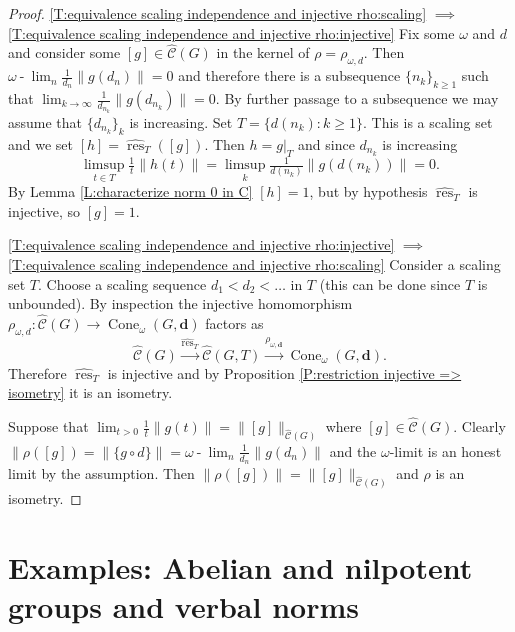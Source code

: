 \documentclass[12pt]{amsart}
\theoremstyle{definition}
\def\res{\operatorname{res}}
\newcommand{\B}[1]{\mathbf{#1}}
\newcommand{\xto}[1]{\xrightarrow{#1}}
\newcommand{\OP}[1]{\operatorname{#1}}
\def\omegalim{\omega\operatorname{-}\lim}
\def\Cone{\OP{Cone}}
\def\tC{\hat{\mathcal{C}}}
\begin{document}
\begin{proof}
\ref{T:equivalence scaling independence and injective rho:scaling} $\implies$ \ref{T:equivalence scaling independence and injective rho:injective}
Fix some $\omega$ and $d$ and consider some $[g] \in \tC(G)$ in the kernel of $\rho=\rho_{\omega,d}$.
Then $\omegalim_n \tfrac{1}{d_n}\|g(d_n)\|=0$ and therefore there is a subsequence $\{ n_k\}_{k \geq 1}$ such that $\lim_{k \to \infty} \tfrac{1}{d_{n_k}} \| g(d_{n_k})\|=0$.
By further passage to a subsequence we may assume that $\{d_{n_k}\}_k$ is increasing.
Set $T=\{ d(n_k) : k \geq 1\}$.
This is a scaling set and we set $[h]=\widehat{\res}_T([g])$.
Then  $h=g|_T$ and since $d_{n_k}$ is increasing
\[
\limsup_{t \in T} \tfrac{1}{t}\|h(t)\| = \limsup_k \tfrac{1}{d(n_k)}\|g(d(n_k))\|=0.
\]
By Lemma \ref{L:characterize norm 0 in C} $[h]=1$, but by hypothesis $\widehat{\res}_T$ is injective, so $[g]=1$.


\ref{T:equivalence scaling independence and injective rho:injective} $\implies$ \ref{T:equivalence scaling independence and injective rho:scaling}
Consider a scaling set $T$.
Choose a scaling sequence $d_1<d_2<\dots$ in $T$ (this can be done since $T$ is unbounded).
By inspection the injective homomorphism $\rho_{\omega,d} \colon \tC(G) \to \Cone_\omega(G,\B d)$ factors as
\[
\tC(G) \xto{\widehat{\res}_T} \tC(G,T) \xto{\rho_{\omega,\B d}} \Cone_\omega(G,\B d).
\]
Therefore $\widehat{\res}_T$ is injective and by Proposition \ref{P:restriction injective => isometry} it is an isometry.


Suppose that $\lim_{t>0} \tfrac{1}{t}\|g(t)\|=\|[g]\|_{\tC(G)}$ where $[g] \in \tC(G)$.
Clearly $\| \rho([g])=\|\{ g \circ d\}\| = \omegalim_n \tfrac{1}{d_n}\|g(d_n)\|$ and the $\omega$-limit is an honest limit by the assumption.
Then $\| \rho([g])\|=\|[g]\|_{\tC(G)}$ and $\rho$ is an isometry.
\end{proof}










\section{Examples: Abelian and nilpotent groups and verbal norms}
\end{document}
